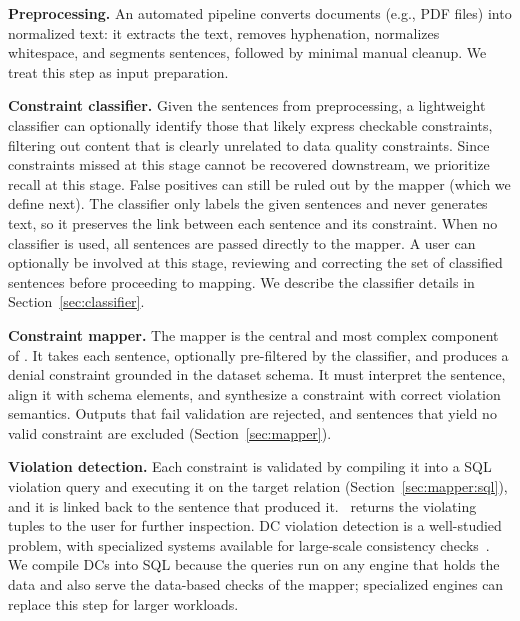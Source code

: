 \smallskip\noindent\textbf{Preprocessing.}
An automated pipeline converts documents (e.g., PDF files) into normalized text: it extracts the text, removes hyphenation, normalizes whitespace, and segments sentences, followed by minimal manual cleanup. We treat this step as input preparation.


\smallskip\noindent\textbf{Constraint classifier.}
Given the sentences from preprocessing, a lightweight classifier can optionally identify those that likely express checkable constraints, filtering out content that is clearly unrelated to data quality constraints.  Since constraints missed at this stage cannot be recovered downstream, we prioritize recall at this stage. False positives can still be ruled out by the mapper (which we define next). The classifier only labels the given sentences and never generates text, so it preserves the link between each sentence and its constraint. When no classifier is used, all sentences are passed directly to the mapper. A user can optionally be involved at this stage, reviewing and correcting the set of classified sentences before proceeding to mapping. We describe the classifier details in Section~\ref{sec:classifier}.


\smallskip\noindent\textbf{Constraint mapper.}
The mapper is the central and most complex component of \system. It takes each sentence, optionally pre-filtered by the classifier, and produces a denial constraint grounded in the dataset schema.
It must interpret the sentence, align it with schema elements, and synthesize a constraint with correct violation semantics. Outputs that fail validation are rejected, and sentences that yield no valid constraint are excluded (Section~\ref{sec:mapper}).


\smallskip\noindent\textbf{Violation detection.}
Each constraint is validated by compiling it into a SQL violation query and executing it on the target relation (Section~\ref{sec:mapper:sql}), and it is linked back to the sentence that produced it. \system\ returns the violating tuples to the user for further inspection. DC violation detection is a well-studied problem, with specialized systems available for large-scale consistency checks~\cite{facet2021,liu2024rapidash,youri2024}. We compile DCs into SQL because the queries run on any engine that holds the data and also serve the data-based checks of the mapper; specialized engines can replace this step for larger workloads.


